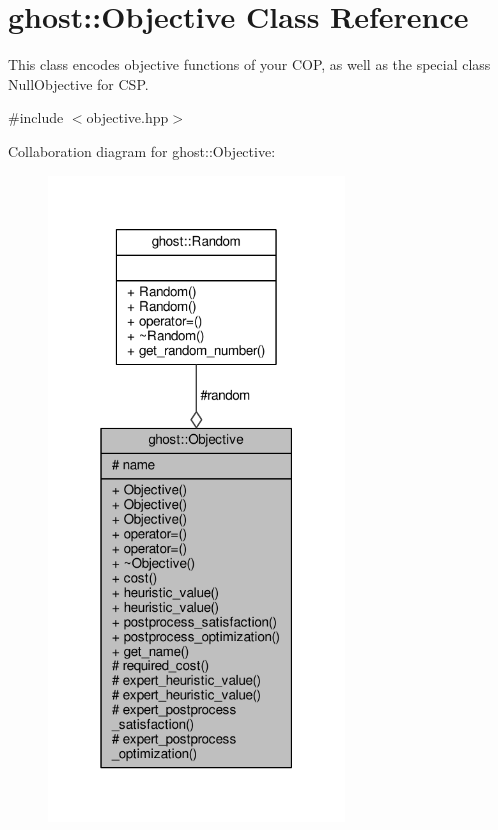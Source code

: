 \hypertarget{classghost_1_1Objective}{}\section{ghost\+:\+:Objective Class Reference}
\label{classghost_1_1Objective}


This class encodes objective functions of your C\+OP, as well as the special class Null\+Objective for C\+SP.  




{\ttfamily \#include $<$objective.\+hpp$>$}



Collaboration diagram for ghost\+:\+:Objective\+:\nopagebreak
\begin{figure}[H]
\begin{center}
\leavevmode
\includegraphics[width=223pt]{classghost_1_1Objective__coll__graph}
\end{center}
\end{figure}
